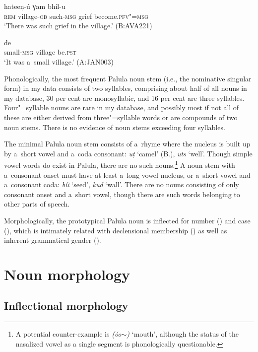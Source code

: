\begin{exe}
\ex
\label{ex:4-5}
 hateeṇ-ú ɣam bhíl-u \\
	\textsc{rem} village-\textsc{ob} such-\textsc{msg} grief become.\textsc{pfv"=msg} \\
\glt `There was such grief in the village.' (B:AVA221)
\end{exe}

\begin{exe}
\ex
\label{ex:4-5b}
 de \\
small-\textsc{msg} village be.\textsc{pst} \\
\glt `It was a~small village.' (A:JAN003)
\end{exe}


Phonologically, the most frequent Palula noun stem (i.e., the nominative singular form) in my data consists of two syllables, comprising about half of all nouns in my database, 30 per cent are monosyllabic, and 16 per cent are three syllables. Four"=syllable nouns are rare in my database, and possibly most if not all of these are either derived from three"=syllable words or are compounds of two noun stems. There is no evidence of noun stems exceeding four syllables. 


The minimal Palula noun stem consists of a~rhyme where the nucleus is built up by a~short vowel and a~coda consonant: \textit{uṭ} `camel' (B.), \textit{uts} `well'. Though simple vowel words do exist in Palula, there are no such nouns.\footnote{A potential counter-example is \textit{(óo$\sim$)} `mouth', although the status of the nasalized vowel as a single segment is phonologically questionable.} A noun stem with a~consonant onset must have at least a~long vowel nucleus, or a~short vowel and a~consonant coda: \textit{bíi} `seed', \textit{kuḍ} `wall'. There are no nouns consisting of only consonant onset and a~short vowel, though there are such words belonging to other parts of speech.


Morphologically, the prototypical Palula noun is inflected for number () and case (), which is intimately related with declensional membership () as well as inherent grammatical gender (). 


\section{Noun morphology}
\label{sec:4-2}

\subsection{Inflectional morphology}
\label{subsec:4-2-1}

